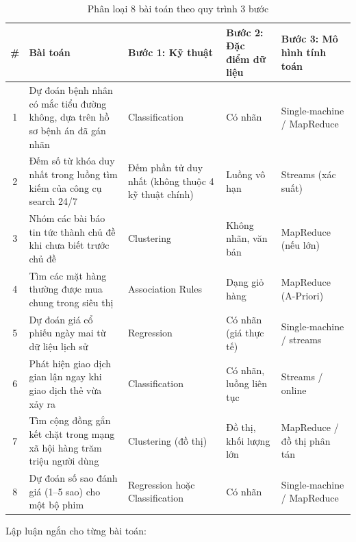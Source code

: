 \documentclass[12pt,a4paper,oneside]{article}
\begin{document}
\begin{table}[H]
\centering
\caption{Phân loại 8 bài toán theo quy trình 3 bước}
\label{tab:8baitoan}
\begin{tabularx}{\textwidth}{c X X X X}
\toprule
\# & Bài toán & Bước 1: Kỹ thuật & Bước 2: Đặc điểm dữ liệu & Bước 3: Mô hình tính toán \\
\midrule
1 & Dự đoán bệnh nhân có mắc tiểu đường không, dựa trên hồ sơ bệnh án đã gán nhãn & Classification & Có nhãn & Single-machine / MapReduce \\
2 & Đếm số từ khóa duy nhất trong luồng tìm kiếm của công cụ search 24/7 & Đếm phần tử duy nhất (không thuộc 4 kỹ thuật chính) & Luồng vô hạn & Streams (xác suất) \\
3 & Nhóm các bài báo tin tức thành chủ đề khi chưa biết trước chủ đề & Clustering & Không nhãn, văn bản & MapReduce (nếu lớn) \\
4 & Tìm các mặt hàng thường được mua chung trong siêu thị & Association Rules & Dạng giỏ hàng & MapReduce (A-Priori) \\
5 & Dự đoán giá cổ phiếu ngày mai từ dữ liệu lịch sử & Regression & Có nhãn (giá thực tế) & Single-machine / streams \\
6 & Phát hiện giao dịch gian lận ngay khi giao dịch thẻ vừa xảy ra & Classification & Có nhãn, luồng liên tục & Streams / online \\
7 & Tìm cộng đồng gắn kết chặt trong mạng xã hội hàng trăm triệu người dùng & Clustering (đồ thị) & Đồ thị, khối lượng lớn & MapReduce / đồ thị phân tán \\
8 & Dự đoán số sao đánh giá (1--5 sao) cho một bộ phim & Regression hoặc Classification & Có nhãn & Single-machine / MapReduce \\
\bottomrule
\end{tabularx}
\end{table}

Lập luận ngắn cho từng bài toán:
\end{document}

